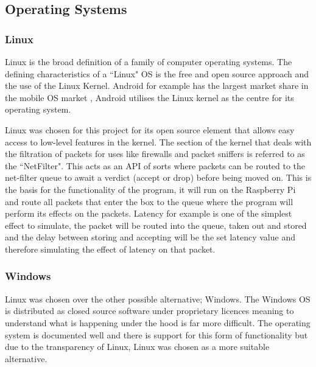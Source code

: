 
\subsection{Operating Systems}

\subsubsection{Linux}
Linux is the broad definition of a family of computer operating systems. The defining characteristics of a ``Linux" OS is the free and open source approach and the use of the Linux Kernel. Android for example has the largest market share in the mobile OS market \citep{share2015desktop}, Android utilises the Linux kernel as the centre for its operating system.

Linux was chosen for this project for its open source element that allows easy access to low-level features in the kernel. The section of the kernel that deals with the filtration of packets for uses like firewalls and packet sniffers is referred to as the ``NetFilter". This acts as an API of sorts where packets can be routed to the net-filter queue to await a verdict (accept or drop) before being moved on. This is the basis for the functionality of the program, it will run on the Raspberry Pi and route all packets that enter the box to the queue where the program will perform its effects on the packets. Latency for example is one of the simplest effect to simulate, the packet will be routed into the queue, taken out and stored and the delay between storing and accepting will be the set latency value and therefore simulating the effect of latency on that packet.


\subsubsection{Windows}
Linux was chosen over the other possible alternative; Windows. The Windows OS is distributed as closed source software under proprietary licences meaning to understand what is happening under the hood is far more difficult. The operating system is documented well and there is support for this form of functionality but due to the transparency of Linux, Linux was chosen as a more suitable alternative.   

